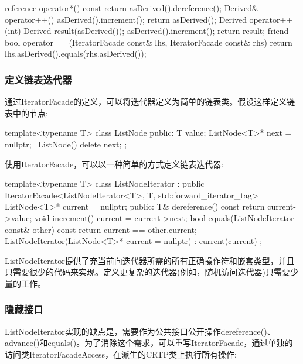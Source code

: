 \begin{cpp}
reference operator*() const {
	return asDerived().dereference();
}
Derived& operator++() {
	asDerived().increment();
	return asDerived();
}
Derived operator++(int) {
	Derived result(asDerived());
	asDerived().increment();
	return result;
}
friend bool operator== (IteratorFacade const& lhs,
IteratorFacade const& rhs) {
	return lhs.asDerived().equals(rhs.asDerived());
}
\end{cpp}

\subsubsection{定义链表迭代器}

通过IteratorFacade的定义，可以将迭代器定义为简单的链表类。假设这样定义链表中的节点:

\begin{cpp}
template<typename T>
class ListNode
{
	public:
	T value;
	ListNode<T>* next = nullptr;
	~ListNode() { delete next; }
};
\end{cpp}

使用IteratorFacade，可以以一种简单的方式定义链表迭代器:

\begin{cpp}
template<typename T>
class ListNodeIterator
: public IteratorFacade<ListNodeIterator<T>, T,
std::forward_iterator_tag>
{
	ListNode<T>* current = nullptr;
	public:
	T& dereference() const {
		return current->value;
	}
	void increment() {
		current = current->next;
	}
	bool equals(ListNodeIterator const& other) const {
		return current == other.current;
	}
	ListNodeIterator(ListNode<T>* current = nullptr) : current(current) { }
};
\end{cpp}

ListNodeIterator提供了充当前向迭代器所需的所有正确操作符和嵌套类型，并且只需要很少的代码来实现。定义更复杂的迭代器(例如，随机访问迭代器)只需要少量的工作。

\subsubsection{隐藏接口}

ListNodeIterator实现的缺点是，需要作为公共接口公开操作dereference()、advance()和equals()。为了消除这个需求，可以重写IteratorFacade，通过单独的访问类IteratorFacadeAccess，在派生的CRTP类上执行所有操作:

